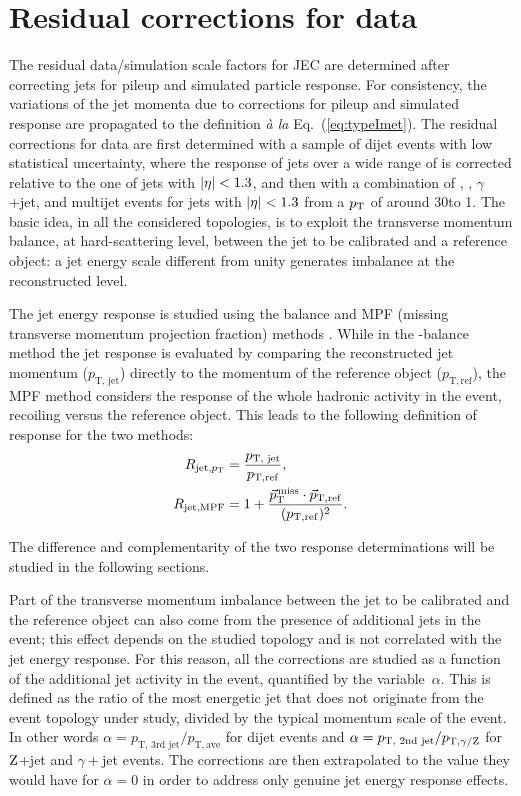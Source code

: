 \documentclass[11pt,twoside,a4paper,cmspaper,final,collab]{cms-tdr}
\begin{document}
\section{Residual corrections for data}
\label{Sec:l2l3res}

The residual data/simulation scale factors for JEC are determined after correcting jets for pileup and simulated particle response.
For consistency, the variations of the jet momenta due to corrections for pileup and simulated response are propagated
to the \ptvecmiss definition \textit{\`a la} Eq.~(\ref{eq:typeImet}).
The residual corrections for data are first determined with a sample of dijet events with low statistical uncertainty, where the response of jets
over a wide range of \pt is corrected relative to the one of jets with $\lvert \eta \rvert<1.3$, and then with a combination of
\zmmjet, \zeejet, $\gamma$+jet, and multijet events for jets with $\lvert \eta \rvert<1.3$ from a
$p_{\mathrm{T}}$ of around 30\GeV to 1\TeV.
The basic idea, in all the considered topologies, is to exploit the transverse momentum balance, at hard-scattering level, between the jet to be calibrated and
a reference object: a jet energy scale different from unity generates imbalance at the reconstructed level.

The jet energy response is studied using the \pt balance and MPF (missing transverse momentum projection fraction) methods \cite{JEC_JINST}. While in the \pt-balance method
the jet response is evaluated by comparing the reconstructed jet momentum ($p_\text{T, jet}$) directly to the momentum of the reference object ($p_\mathrm{T, ref}$),
the MPF method considers the response of the whole hadronic activity in the event, recoiling versus the reference object.
This leads to the following definition of response for the two methods:
\begin{align}
R_{\text{jet}, p_{\mathrm{T}}} &= \frac{p_\text{T, jet}}{p_\mathrm{T, ref}}, \label{eq:ptbalance_def}\\
R_{\text{jet}, \mathrm{MPF}} &= 1 + \frac{{\vec p}_{\mathrm{T}}^{\kern1pt\text{miss}} \cdot \vec{p}_\mathrm{T, ref}}{(p_\mathrm{T, ref})^2}.\label{eq:MPF_def}
\end{align}

The difference and complementarity of the two response determinations will be studied in the following sections.

Part of the transverse momentum imbalance between the jet to be calibrated and the reference object can also come from the
presence of additional jets in the event; this effect depends on the studied topology and is not correlated with the jet energy response.
For this reason, all the corrections are studied as a function of the additional jet activity in the event, quantified by the variable~$\alpha$. This is
defined as the ratio of the most energetic jet that does not originate from the event topology under study, divided by the typical momentum scale
of the event. In other words $\alpha=p_\text{T, 3rd jet}/p_\mathrm{T, ave}$ for dijet events and $\alpha=p_\text{T, 2nd jet}/p_{\mathrm{T}, \gamma/\mathrm{Z}}$ for $\mathrm{Z}$+jet and $\gamma+$jet events.
The corrections are then extrapolated to the value they would have for $\alpha=0$ in order to address only genuine
jet energy response effects.
\end{document}
